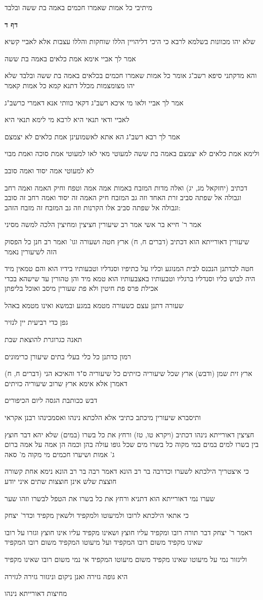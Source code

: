 \documentclass[12pt, openany]{book}
\newcommand{\sethebfont}{
\fontsize{10.5pt}{21.0pt} \selectfont
}
\newcommand{\textblock}[1]{
{\sethebfont #1\\}	
}
\newcommand{\sectname}{}
\newcommand{\newsection}[1]{
	\addcontentsline{toc}{section}{#1}
	\renewcommand{\sectname}{#1}	
	\vspace{-\baselineskip}
	\begin{center}
		\textbf{%
\fontsize{16pt}{16pt}\selectfont
			#1}
	\end{center}
	\vspace{-\baselineskip}
	\nopagebreak
}
\begin{document}
\textblock{מיתיבי כל אמות שאמרו חכמים באמה בת ששה ובלבד}
\newsection{דף ד}
\textblock{שלא יהו מכוונות בשלמא לרבא כי היכי דליהויין הללו שוחקות והללו עצבות אלא לאביי קשיא}
\textblock{אמר לך אביי אימא אמת כלאים באמה בת ששה}
\textblock{והא מדקתני סיפא רשב"ג אומר כל אמות שאמרו חכמים בכלאים באמה בת ששה ובלבד שלא יהו מצומצמות מכלל דתנא קמא כל אמות קאמר}
\textblock{אמר לך אביי ולאו מי איכא רשב"ג דקאי כוותי אנא דאמרי כרשב"ג}
\textblock{לאביי ודאי תנאי היא לרבא מי לימא תנאי היא}
\textblock{אמר לך רבא רשב"ג הא אתא לאשמועינן אמת כלאים לא יצמצם}
\textblock{ולימא אמת כלאים לא יצמצם באמה בת ששה למעוטי מאי לאו למעוטי אמת סוכה ואמת מבוי}
\textblock{לא למעוטי אמה יסוד ואמה סובב}
\textblock{דכתיב (יחזקאל מג, יג) ואלה מדות המזבח באמות אמה אמה וטפח וחיק האמה ואמה רחב וגבולה אל שפתה סביב זרת האחד וזה גב המזבח חיק האמה זה יסוד ואמה רחב זה סובב וגבולה אל שפתה סביב אלו הקרנות וזה גב המזבח זה מזבח הזהב:}
\textblock{אמר ר' חייא בר אשי אמר רב שיעורין חציצין ומחיצין הלכה למשה מסיני}
\textblock{שיעורין דאורייתא הוא דכתיב (דברים ח, ח) ארץ חטה ושעורה וגו' ואמר רב חנן כל הפסוק הזה לשיעורין נאמר}
\textblock{חטה לכדתנן הנכנס לבית המנוגע וכליו על כתיפיו וסנדליו וטבעותיו בידיו הוא והם טמאין מיד היה לבוש כליו וסנדליו ברגליו וטבעותיו באצבעותיו הוא טמא מיד והן טהורין עד שישהא בכדי אכילת פרס פת חיטין ולא פת שעורין מיסב ואוכל בליפתן}
\textblock{שעורה דתנן עצם כשעורה מטמא במגע ובמשא ואינו מטמא באהל}
\textblock{גפן כדי רביעית יין לנזיר}
\textblock{תאנה כגרוגרת להוצאת שבת}
\textblock{רמון כדתנן כל כלי בעלי בתים שיעורן כרימונים}
\textblock{(דברים ח, ח) ארץ זית שמן (ודבש) ארץ שכל שיעוריה כזיתים כל שיעוריה ס"ד והאיכא הני דאמרן אלא אימא ארץ שרוב שיעוריה כזיתים}
\textblock{דבש ככותבת הגסה ליום הכיפורים}
\textblock{ותיסברא שיעורין מיכתב כתיבי אלא הלכתא נינהו ואסמכינהו רבנן אקראי}
\textblock{חציצין דאורייתא נינהו דכתיב (ויקרא טו, טז) ורחץ את כל בשרו (במים) שלא יהא דבר חוצץ בין בשרו למים במים במי מקוה כל בשרו מים שכל גופו עולה בהן וכמה הן אמה על אמה ברום ג' אמות ושיערו חכמים מי מקוה מ' סאה}
\textblock{כי איצטריך הילכתא לשערו וכדרבה בר רב הונא דאמר רבה בר רב הונא נימא אחת קשורה חוצצת שלש אינן חוצצות שתים איני יודע}
\textblock{שערו נמי דאורייתא הוא דתניא ורחץ את כל בשרו את הטפל לבשרו וזהו שער}
\textblock{כי אתאי הילכתא לרובו ולמיעוטו ולמקפיד ולשאין מקפיד וכדר' יצחק}
\textblock{דאמר ר' יצחק דבר תורה רובו ומקפיד עליו חוצץ ושאינו מקפיד עליו אינו חוצץ וגזרו על רובו שאינו מקפיד משום רובו המקפיד ועל מיעוטו המקפיד משום רובו המקפיד}
\textblock{וליגזור נמי על מיעוטו שאינו מקפיד משום מיעוטו המקפיד אי נמי משום רובו שאינו מקפיד}
\textblock{היא גופה גזירה ואנן ניקום וניגזור גזירה לגזירה}
\textblock{מחיצות דאורייתא נינהו}
\end{document}
